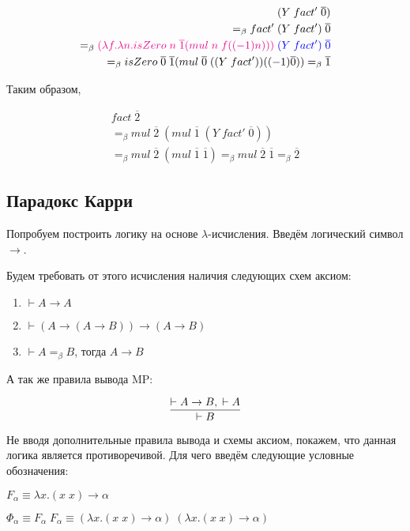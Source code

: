 \begin{align*}
	(Y \; fact' \; \overline{0}) \\ =_{\beta} fact' \; (Y \; fact') \; \overline{0} \\ =_{\beta} \textcolor{magenta}{(\lambda f. \lambda n. isZero\; n \; \overline{1} (mul \; n \; f((-1) n)))} \; \textcolor{blue}{(Y \; fact') \; \overline{0}} \\ =_{\beta}  isZero\; \overline{0} \; \overline{1} (mul \; \overline{0} \; ((Y \; fact'))((-1) \overline{0})) =_{\beta} \overline{1}
\end{align*}

Таким образом,

\begin{align*}
	fact \; \overline{2} \\ =_{\beta} mul \; \overline{2} \; (mul \; \overline{1} \; (Y \; fact' \; \overline{0})) \\=_{\beta} mul \; \overline{2} \; (mul \; \overline{1} \; \overline{1}) =_{\beta} mul \; \overline{2} \; \overline{1} =_{\beta} \overline{2}
\end{align*}

\subsection{Парадокс Карри}

Попробуем построить логику на основе $\lambda$-исчисления. Введём логический символ $\rightarrow$. 

Будем требовать от этого исчисления наличия следующих схем аксиом:

\begin{enumerate}
	\item $\vdash A \rightarrow A$
	\item $\vdash (A \rightarrow (A \rightarrow B)) \rightarrow (A \rightarrow B)$
	\item $\vdash A =_{\beta} B$, тогда $A \rightarrow B$
\end{enumerate}

А так же правила вывода MP:

$$\infer{\vdash B}{\vdash A \rightarrow B, \; \vdash A}$$

Не вводя дополнительные правила вывода и схемы аксиом, покажем, что данная логика является противоречивой. Для чего введём следующие условные обозначения:

$F_{\alpha} \equiv \lambda x. (x \; x) \rightarrow \alpha$

$\Phi_{\alpha} \equiv F_{\alpha}  \; F_{\alpha}  \equiv (\lambda x. (x \; x) \rightarrow \alpha) \; (\lambda x. (x \; x) \rightarrow \alpha)$


